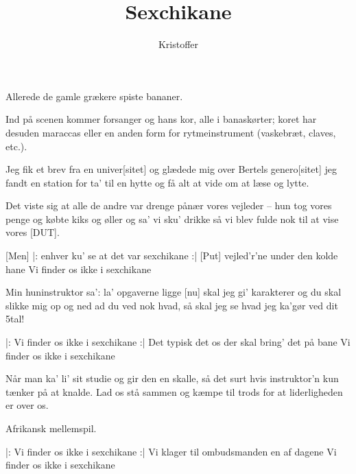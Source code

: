 \documentclass[a4paper,11pt]{article}
\title{Sexchikane}
\author{Kristoffer}
\begin{document}
\maketitle

Allerede de gamle grækere spiste bananer.

\bigskip

\noindent
	Ind på scenen kommer forsanger og hans kor, alle i banaskørter; koret
	har desuden maraccas eller en anden form for rytmeinstrument
	(vaskebræt, claves, etc.).

\begin{song}
		Jeg fik et brev fra en univer[sitet] 
		og glædede mig over Bertels genero[sitet] 
		jeg fandt en station for ta' til en hytte 
		og få alt at vide om at læse og lytte. 

\bigskip

		Det viste sig at alle de andre var drenge 
		pånær vores vejleder -- hun tog vores penge 
		og købte kiks og øller og sa' vi sku' drikke 
		så vi blev fulde nok til at vise vores [DUT]. 

\bigskip



		[Men] |: enhver ku' se at det var sexchikane :| 
		[Put] vejled'r'ne under den kolde hane  
		Vi finder os ikke i sexchikane 

\bigskip

		Min huninstruktor sa': la' opgaverne ligge 
		[nu] skal jeg gi' karakterer og du skal slikke 
		mig op og ned ad du ved nok hvad, 
		så skal jeg se hvad jeg ka'gør ved dit 5tal! 
\bigskip

		|: Vi finder os ikke i sexchikane :| 
		Det typisk det os der skal bring' det på bane 
		Vi finder os ikke i sexchikane 

\bigskip

		Når man ka' li' sit studie og gir den en skalle, 
		så det surt hvis instruktor'n kun tænker på at
                knalde. 
		Lad os stå sammen og kæmpe til trods 
		for at liderligheden er over os. 

\bigskip

	Afrikansk mellemspil. 

\bigskip

		|: Vi finder os ikke i sexchikane :| 
		Vi klager til ombudsmanden en af dagene 
		Vi finder os ikke i sexchikane 

\end{song}
\end{document}
